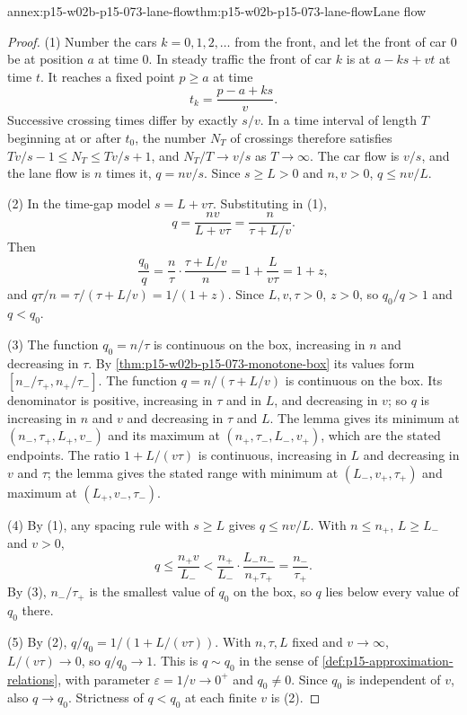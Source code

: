 \begin{annexitem}{annex:p15-w02b-p15-073-lane-flow}{thm:p15-w02b-p15-073-lane-flow}{Lane flow}
\begin{proof}
(1) Number the cars \(k=0,1,2,\ldots\) from the front, and let the front of
car \(0\) be at position \(a\) at time \(0\). In steady traffic the front of
car \(k\) is at \(a-ks+vt\) at time \(t\). It reaches a fixed point \(p\geq a\)
at time
\[
 t_k=\frac{p-a+ks}{v}.
\]
Successive crossing times differ by exactly \(s/v\). In a time interval of
length \(T\) beginning at or after \(t_0\), the number \(N_T\) of crossings therefore satisfies
\(Tv/s-1\leq N_T\leq Tv/s+1\), and \(N_T/T\to v/s\) as \(T\to\infty\).
The car flow is \(v/s\), and the lane flow is \(n\) times it, \(q=nv/s\).
Since \(s\geq L>0\) and \(n,v>0\), \(q\leq nv/L\).

(2) In the time-gap model \(s=L+v\tau\). Substituting in (1),
\[
 q=\frac{nv}{L+v\tau}=\frac{n}{\tau+L/v}.
\]
Then
\[
 \frac{q_0}{q}=\frac n\tau\cdot\frac{\tau+L/v}{n}=1+\frac{L}{v\tau}=1+z,
\]
and \(q\tau/n=\tau/(\tau+L/v)=1/(1+z)\). Since \(L,v,\tau>0\), \(z>0\), so
\(q_0/q>1\) and \(q<q_0\).

(3) The function \(q_0=n/\tau\) is continuous on the box, increasing in \(n\)
and decreasing in \(\tau\). By \cref{thm:p15-w02b-p15-073-monotone-box} its
values form \([n_-/\tau_+,n_+/\tau_-]\).
The function \(q=n/(\tau+L/v)\) is continuous on the box. Its denominator
is positive, increasing in \(\tau\) and in \(L\), and decreasing in \(v\);
so \(q\) is increasing in \(n\) and \(v\) and decreasing in \(\tau\) and
\(L\). The lemma gives its minimum at \((n_-,\tau_+,L_+,v_-)\) and its maximum
at \((n_+,\tau_-,L_-,v_+)\), which are the stated endpoints.
The ratio \(1+L/(v\tau)\) is continuous, increasing in \(L\) and decreasing in
\(v\) and \(\tau\); the lemma gives the stated range with minimum at
\((L_-,v_+,\tau_+)\) and maximum at \((L_+,v_-,\tau_-)\).

(4) By (1), any spacing rule with \(s\geq L\) gives \(q\leq nv/L\).
With \(n\leq n_+\), \(L\geq L_-\) and \(v>0\),
\[
 q\leq\frac{n_+v}{L_-}
 <\frac{n_+}{L_-}\cdot\frac{L_-n_-}{n_+\tau_+}
 =\frac{n_-}{\tau_+}.
\]
By (3), \(n_-/\tau_+\) is the smallest value of \(q_0\) on the box, so \(q\)
lies below every value of \(q_0\) there.

(5) By (2), \(q/q_0=1/(1+L/(v\tau))\). With \(n,\tau,L\) fixed and
\(v\to\infty\), \(L/(v\tau)\to0\), so \(q/q_0\to1\). This is \(q\sim q_0\) in
the sense of \cref{def:p15-approximation-relations}, with parameter
\(\varepsilon=1/v\to0^+\) and \(q_0\neq0\). Since \(q_0\) is independent of
\(v\), also \(q\to q_0\). Strictness of \(q<q_0\) at each finite \(v\) is (2).
\end{proof}
\end{annexitem}

